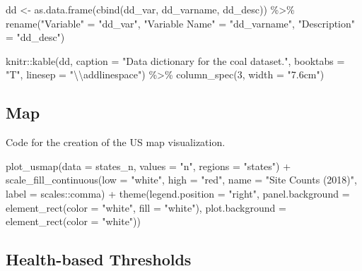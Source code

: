 \documentclass[12pt, twoside]{amherstthesis}
\newenvironment{Shaded}{\begin{snugshade}}{\end{snugshade}}
\newcommand{\AttributeTok}[1]{\textcolor[rgb]{0.77,0.63,0.00}{#1}}
\newcommand{\DecValTok}[1]{\textcolor[rgb]{0.00,0.00,0.81}{#1}}
\newcommand{\FunctionTok}[1]{\textcolor[rgb]{0.00,0.00,0.00}{#1}}
\newcommand{\NormalTok}[1]{#1}
\newcommand{\OtherTok}[1]{\textcolor[rgb]{0.56,0.35,0.01}{#1}}
\newcommand{\SpecialCharTok}[1]{\textcolor[rgb]{0.00,0.00,0.00}{#1}}
\newcommand{\StringTok}[1]{\textcolor[rgb]{0.31,0.60,0.02}{#1}}
\begin{document}
\begin{Shaded}
\begin{Highlighting}[]
\NormalTok{dd }\OtherTok{\textless{}{-}} \FunctionTok{as.data.frame}\NormalTok{(}\FunctionTok{cbind}\NormalTok{(dd\_var, dd\_varname, dd\_desc)) }\SpecialCharTok{\%\textgreater{}\%}
  \FunctionTok{rename}\NormalTok{(}\StringTok{"Variable"} \OtherTok{=} \StringTok{"dd\_var"}\NormalTok{,}
         \StringTok{"Variable Name"} \OtherTok{=} \StringTok{"dd\_varname"}\NormalTok{,}
         \StringTok{"Description"} \OtherTok{=} \StringTok{"dd\_desc"}\NormalTok{) }

\NormalTok{knitr}\SpecialCharTok{::}\FunctionTok{kable}\NormalTok{(dd, }\AttributeTok{caption =} \StringTok{"Data dictionary for the coal dataset."}\NormalTok{,}
             \AttributeTok{booktabs =} \StringTok{"T"}\NormalTok{, }\AttributeTok{linesep =} \StringTok{"}\SpecialCharTok{\textbackslash{}\textbackslash{}}\StringTok{addlinespace"}\NormalTok{) }\SpecialCharTok{\%\textgreater{}\%}
             \FunctionTok{column\_spec}\NormalTok{(}\DecValTok{3}\NormalTok{, }\AttributeTok{width =} \StringTok{"7.6cm"}\NormalTok{)}
\end{Highlighting}
\end{Shaded}
\hypertarget{map}{%
\subsection{Map}\label{map}}

Code for the creation of the US map visualization.
\begin{Shaded}
\begin{Highlighting}[]
\FunctionTok{plot\_usmap}\NormalTok{(}\AttributeTok{data =}\NormalTok{ states\_n, }\AttributeTok{values =} \StringTok{"n"}\NormalTok{, }\AttributeTok{regions =} \StringTok{"states"}\NormalTok{) }\SpecialCharTok{+}
  \FunctionTok{scale\_fill\_continuous}\NormalTok{(}\AttributeTok{low =} \StringTok{"white"}\NormalTok{, }\AttributeTok{high =} \StringTok{"red"}\NormalTok{, }
                        \AttributeTok{name =} \StringTok{"Site Counts (2018)"}\NormalTok{, }
                        \AttributeTok{label =}\NormalTok{ scales}\SpecialCharTok{::}\NormalTok{comma) }\SpecialCharTok{+} 
  \FunctionTok{theme}\NormalTok{(}\AttributeTok{legend.position =} \StringTok{"right"}\NormalTok{,}
        \AttributeTok{panel.background =} \FunctionTok{element\_rect}\NormalTok{(}\AttributeTok{color =} \StringTok{"white"}\NormalTok{, }
                                        \AttributeTok{fill =} \StringTok{"white"}\NormalTok{),}
        \AttributeTok{plot.background =} \FunctionTok{element\_rect}\NormalTok{(}\AttributeTok{color =} \StringTok{"white"}\NormalTok{))}
\end{Highlighting}
\end{Shaded}
\hypertarget{health-based-thresholds}{%
\subsection{Health-based Thresholds}\label{health-based-thresholds}}
\end{document}
